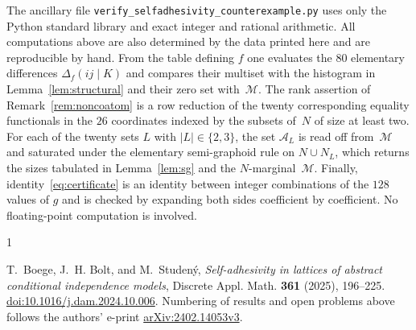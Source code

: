 \documentclass[11pt]{amsart}
\newcommand{\M}{\mathcal{M}}
\newcommand{\A}{\mathcal{A}}
\begin{document}
The ancillary file \texttt{verify\_selfadhesivity\_counterexample.py} uses
only the Python standard library and exact integer and rational arithmetic.
All computations above are also determined by the data printed here and are
reproducible by hand. From the table
defining $f$ one evaluates the $80$ elementary differences
$\Delta_f(ij\mid K)$ and compares their multiset with the histogram in
Lemma~\ref{lem:structural} and their zero set with~$\M$. The rank assertion
of Remark~\ref{rem:noncoatom} is a row reduction of the twenty
corresponding equality functionals in the $26$ coordinates indexed by the
subsets of~$N$ of size at least two. For each of the twenty sets $L$ with
$|L|\in\{2,3\}$, the set $\A_L$ is read off from~$\M$ and saturated under
the elementary semi-graphoid rule on $N\cup N_L$, which returns the sizes
tabulated in Lemma~\ref{lem:sg} and the $N$-marginal~$\M$. Finally,
identity~\eqref{eq:certificate} is an identity between integer combinations
of the $128$ values of $g$ and is checked by expanding both sides
coefficient by coefficient. No floating-point computation is involved.

\begin{thebibliography}{1}

T.~Boege, J.~H. Bolt, and M.~Studen\'y,
\emph{Self-adhesivity in lattices of abstract conditional independence
models},
Discrete Appl. Math. \textbf{361} (2025), 196--225.
\href{https://doi.org/10.1016/j.dam.2024.10.006}
{doi:10.1016/j.dam.2024.10.006}.
Numbering of results and open problems above follows the authors' e-print
\href{https://arxiv.org/abs/2402.14053v3}{arXiv:2402.14053v3}.

\end{thebibliography}
\end{document}
